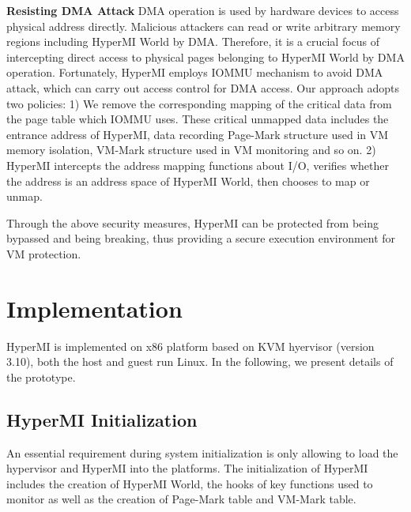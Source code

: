 \documentclass[conference]{IEEEtran}
\begin{document}
\textbf{Resisting DMA Attack}
DMA operation is used by hardware devices to access physical address directly. Malicious attackers can read or write arbitrary memory regions including HyperMI World by DMA. Therefore, it is a crucial focus of intercepting direct access to physical pages belonging to HyperMI World by DMA operation. 
Fortunately, HyperMI employs IOMMU mechanism to avoid DMA attack, which can carry out access control for DMA access. Our approach adopts two policies: 1) We remove the corresponding mapping of the critical data from the page table which IOMMU uses. These critical unmapped data includes the entrance address of HyperMI, data recording Page-Mark structure used in VM memory isolation, VM-Mark structure used in VM monitoring and so on. 2) HyperMI intercepts the address mapping functions about I/O, verifies whether the address is an address space of HyperMI World, then chooses to map or unmap.


Through the above security measures, HyperMI can be protected from being bypassed and being breaking, thus providing a secure execution environment for VM protection.




















\iffalse
\section{Implementation}\label{sec:imp}

HyperMI is implemented on x86 platform based on KVM hyervisor (version 3.10), both the host and guest run Linux. In the following, we present details of the prototype. 

\subsection {HyperMI Initialization}
An essential requirement during system initialization is only allowing to load the hypervisor and HyperMI into the platforms.
The initialization of HyperMI includes the creation of HyperMI World, the hooks of key functions used to monitor as well as the creation of Page-Mark table and VM-Mark table. 
\end{document}
